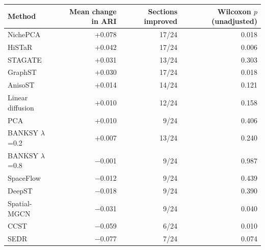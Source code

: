 \footnotesize
\begin{tabular}{lrrr}
\toprule
Method & Mean change in ARI & Sections improved & Wilcoxon $p$ (unadjusted) \\
\midrule
NichePCA & +0.078 & 17/24 & 0.018 \\
HiSTaR & +0.042 & 17/24 & 0.006 \\
STAGATE & +0.031 & 13/24 & 0.303 \\
GraphST & +0.030 & 17/24 & 0.018 \\
AnisoST & +0.014 & 14/24 & 0.121 \\
Linear diffusion & +0.010 & 12/24 & 0.158 \\
PCA & +0.010 & 9/24 & 0.406 \\
BANKSY $\lambda$=0.2 & +0.007 & 13/24 & 0.240 \\
BANKSY $\lambda$=0.8 & $-$0.001 & 9/24 & 0.987 \\
SpaceFlow & $-$0.012 & 9/24 & 0.439 \\
DeepST & $-$0.018 & 9/24 & 0.390 \\
Spatial-MGCN & $-$0.031 & 9/24 & 0.040 \\
CCST & $-$0.059 & 6/24 & 0.010 \\
SEDR & $-$0.077 & 7/24 & 0.074 \\
\bottomrule
\end{tabular}
